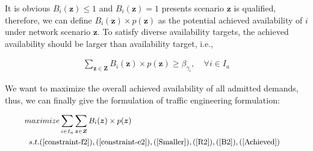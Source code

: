 \documentclass[sigconf]{acmart}
\begin{document}
It is obvious  $B_i(\bm{z}) \le 1$ and $B_i(\bm{z})=1$ presents scenario $\bm{z}$ is qualified, therefore, 
we can define $B_i(\bm{z})\times p(\bm{z})$  as the potential achieved availability of $i$ under network scenario  $\bm{z}$.
To satisfy diverse availability targets, the achieved availability should be larger than availability target, i.e., 
 
 \begin{eqnarray} \label{Achieved}
\sum_{\bm{z}\in \bm{Z}}B_i(\bm{z})\times p(\bm{z}) \ge \beta_{\gamma_{i}},  \quad {\forall i \in I_a}
\end{eqnarray}



We want to maximize the overall achieved availability of all admitted demands,  thus,  we can finally give the formulation of traffic engineering formulation: 



\begin{equation}
\small
\begin{aligned} \label{BATE-TE}
 &maximize  \sum_{i\in I_a} \sum_{\bm{z}\in \bm{Z}}B_i(\bm{z})\times p(\bm{z})\\
&\begin{array}{r@{\quad}r@{}l@{\quad}l}
s.t. (\ref{constraint-f2}), (\ref{constraint-e2}), (\ref{Smaller}), (\ref{R2}), (\ref{B2}), (\ref{Achieved})
\end{array}
\end{aligned}
\end{equation}

\end{document}
